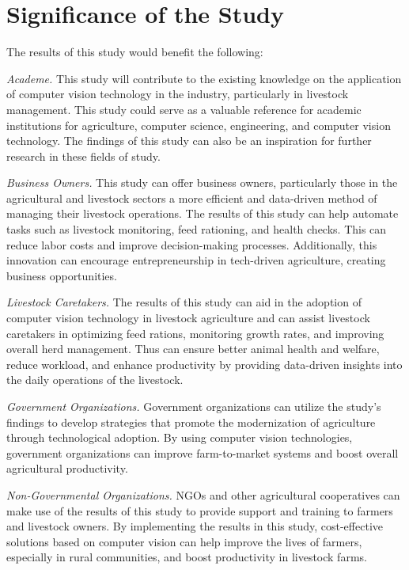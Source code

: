 {\section{Significance of the Study}

The results of this study would benefit the following: 

\textit{Academe.} This study will contribute to the existing knowledge on the application of computer vision technology in the industry, particularly in livestock management. This study could serve as a valuable reference for academic institutions for agriculture, computer science, engineering, and computer vision technology. The findings of this study can also be an inspiration for further research in these fields of study.

\textit{Business Owners.} This study can offer business owners, particularly those in the agricultural and livestock sectors a more efficient and data-driven method of managing their livestock operations. The results of this study can help automate tasks such as livestock monitoring, feed rationing, and health checks. This can reduce labor costs and improve decision-making processes. Additionally, this innovation can encourage entrepreneurship in tech-driven agriculture, creating business opportunities.

\textit{Livestock Caretakers.} The results of this study can aid in the adoption of computer vision technology in livestock agriculture and can assist livestock caretakers in optimizing feed rations, monitoring growth rates, and improving overall herd management. Thus can ensure better animal health and welfare, reduce workload, and enhance productivity by providing data-driven insights into the daily operations of the livestock.

\textit{Government Organizations.} Government organizations can utilize the study’s findings to develop strategies that promote the modernization of agriculture through technological adoption. By using computer vision technologies, government organizations can improve farm-to-market systems and boost overall agricultural productivity.

\textit{Non-Governmental Organizations.} NGOs and other agricultural cooperatives can make use of the results of this study to provide support and training to farmers and livestock owners. By implementing the results in this study, cost-effective solutions based on computer vision can help improve the lives of farmers, especially in rural communities, and boost productivity in livestock farms.

}
